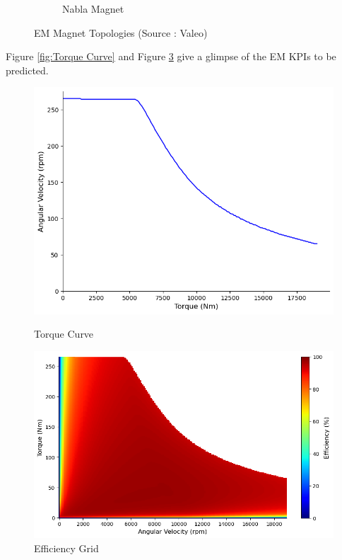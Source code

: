 \documentclass{report} %
\begin{document}
\begin{figure}[H]
\begin{subfigure}{0.32\textwidth}
        \caption{Nabla Magnet}
        \label{fig:Nabla Magnet}
    \end{subfigure}
    \caption{\ac{EM} Magnet Topologies (Source : Valeo)}
    \label{fig:EM Magnet Topologies}
\end{figure}

Figure \ref{fig:Torque Curve} and Figure \ref{fig:Efficiency Grid} give a glimpse of the \ac{EM} \ac{KPI}s to be predicted.
\begin{figure}[H]
    \centering
    \begin{minipage}[b]{0.44\textwidth}
        \centering
        \includegraphics[width=\textwidth]{./ReportImages/TorqueCurve.png}
        \caption{Torque Curve} %
        \label{fig:Torque Curve}
    \end{minipage}
    \hfill
    \begin{minipage}[b]{0.54\textwidth}
        \centering
        \includegraphics[width=\textwidth]{./ReportImages/EfficiencyGrid.png}
        \caption{Efficiency Grid}
        \label{fig:Efficiency Grid}
    \end{minipage}
\end{figure}
\end{document}
